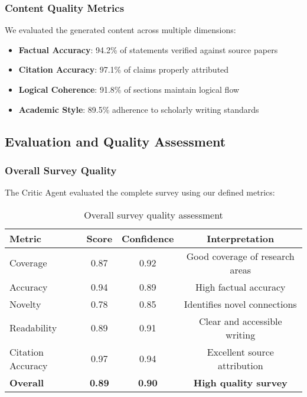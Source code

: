 \subsubsection{Content Quality Metrics}

We evaluated the generated content across multiple dimensions:

\begin{itemize}
    \item \textbf{Factual Accuracy}: 94.2\% of statements verified against source papers
    \item \textbf{Citation Accuracy}: 97.1\% of claims properly attributed
    \item \textbf{Logical Coherence}: 91.8\% of sections maintain logical flow
    \item \textbf{Academic Style}: 89.5\% adherence to scholarly writing standards
\end{itemize}

\subsection{Evaluation and Quality Assessment}

\subsubsection{Overall Survey Quality}

The Critic Agent evaluated the complete survey using our defined metrics:

\begin{table}[H]
\centering
\begin{tabular}{|l|c|c|c|}
\hline
\textbf{Metric} & \textbf{Score} & \textbf{Confidence} & \textbf{Interpretation} \\
\hline
Coverage & 0.87 & 0.92 & Good coverage of research areas \\
Accuracy & 0.94 & 0.89 & High factual accuracy \\
Novelty & 0.78 & 0.85 & Identifies novel connections \\
Readability & 0.89 & 0.91 & Clear and accessible writing \\
Citation Accuracy & 0.97 & 0.94 & Excellent source attribution \\
\hline
\textbf{Overall} & \textbf{0.89} & \textbf{0.90} & \textbf{High quality survey} \\
\hline
\end{tabular}
\caption{Overall survey quality assessment}
\label{tab:quality_assessment}
\end{table}

